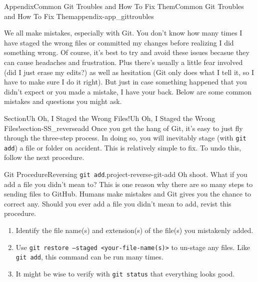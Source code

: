 \documentclass[oneside,10pt,]{book}
\newcommand{\mono}[1]{\texttt{#1}}
\begin{document}
\begin{appendixptx}{Appendix}{Common Git Troubles and How To Fix Them}{}{Common Git Troubles and How To Fix Them}{}{}{appendix-app_gittroubles}
\renewcommand*{\appendixname}{Appendix}
%
\begin{introduction}{}%
We all make mistakes, especially with Git. You don't know how many times I have staged the wrong files or committed my changes before realizing I did something wrong. Of course, it's best to try and avoid these issues becasue they can cause headaches and frustration. Plus there's usually a little fear involved (did I just erase my edits?) as well as hesitation (Git only does what I tell it, so I have to make sure I do it right). But just in case something happened that you didn't expect or you made a mistake, I have your back. Below are some common mistakes and questions you might ask.%
\end{introduction}%
%
%
\typeout{************************************************}
\typeout{************************************************}
%
\begin{sectionptx}{Section}{Uh Oh, I Staged the Wrong Files!}{}{Uh Oh, I Staged the Wrong Files!}{}{}{section-SS_reverseadd}
%
%
Once you get the hang of Git, it's easy to just fly through the three-step process. In doing so, you will inevitably stage (with \mono{git add}) a file or folder on accident. This is relatively simple to fix. To undo this, follow the next procedure.%
\begin{project}{Git Procedure}{Reversing \mono{git add}.}{project-reverse-git-add}%
Oh shoot. What if you add a file you didn't mean to? This is one reason why there are so many steps to sending files to GitHub. Humans make mistakes and Git gives you the chance to correct any. Should you ever add a file you didn't mean to add, revist this procedure.%
\begin{enumerate}[font=\bfseries,label=(\alph*),ref=\alph*]%
\item{}Identify the file name(s) and extension(s) of the file(s) you mistakenly added.%
\item{}Use \mono{git restore --staged <your-file-name(s)>} to un-stage any files. Like \mono{git add}, this command can be run many times.%
\item{}It might be wise to verify with \mono{git status} that everything looks good.%
\end{enumerate}%
\end{project}%

\end{sectionptx}
\end{appendixptx}
\end{document}
